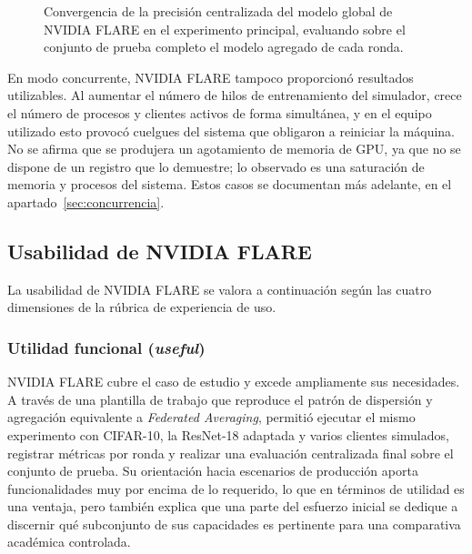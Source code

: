 \begin{figure}[htbp]
  \centering
  \caption{Convergencia de la precisión centralizada del modelo global de NVIDIA FLARE en el
  experimento principal, evaluando sobre el conjunto de prueba completo el modelo agregado de
  cada ronda.}
  \label{fig:nvflare-conv}
\end{figure}

En modo concurrente, NVIDIA FLARE tampoco proporcionó resultados utilizables. Al aumentar el
número de hilos de entrenamiento del simulador, crece el número de procesos y clientes activos
de forma simultánea, y en el equipo utilizado esto provocó cuelgues del sistema que obligaron a
reiniciar la máquina. No se afirma que se produjera un agotamiento de memoria de GPU, ya que no
se dispone de un registro que lo demuestre; lo observado es una saturación de memoria y procesos
del sistema. Estos casos se documentan más adelante, en el apartado~\ref{sec:concurrencia}.

\subsection{Usabilidad de NVIDIA FLARE}\label{sec:usab-flare}

La usabilidad de NVIDIA FLARE se valora a continuación según las cuatro dimensiones
de la rúbrica de experiencia de uso.

\subsubsection{Utilidad funcional (\textit{useful})}\label{sec:usab-flare-useful}

NVIDIA FLARE cubre el caso de estudio y excede ampliamente sus necesidades. A través de una
plantilla de trabajo que reproduce el patrón de dispersión y agregación equivalente a
\textit{Federated Averaging}, permitió ejecutar el mismo experimento con CIFAR-10, la
ResNet-18 adaptada y varios clientes simulados, registrar métricas por ronda y realizar una
evaluación centralizada final sobre el conjunto de prueba. Su orientación hacia escenarios
de producción aporta funcionalidades muy por encima de lo requerido, lo que en términos de
utilidad es una ventaja, pero también explica que una parte del esfuerzo inicial se dedique
a discernir qué subconjunto de sus capacidades es pertinente para una comparativa académica
controlada.


